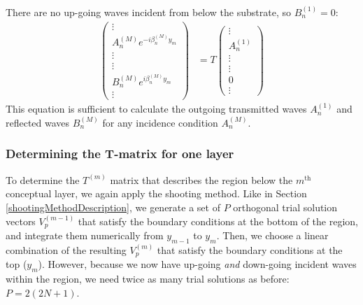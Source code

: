 There are no up-going waves incident from below the substrate, so $B^{(1)}_n = 0$:
\begin{align}
\left(\begin{array}{c}\vdots \\ A^{(M)}_n  e^{-i \beta^{(M)}_n y_m} \\ \vdots \\\hline \vdots \\ B^{(M)}_n e^{i \beta^{(M)}_n y_m} \\ \vdots\end{array}\right)  &= T \left(\begin{array}{c}\vdots \\ A^{(1)}_n \\ \vdots \\\hline \vdots \\ 0 \\ \vdots\end{array}\right)
\label{tMatrixFullStack}
\end{align}
This equation is sufficient to calculate the outgoing transmitted waves $A^{(1)}_n$ and reflected waves $B^{(M)}_n$ for any incidence condition $A_n^{(M)}$.

\subsubsection{Determining the T-matrix for one layer}
To determine the $T^{(m)}$ matrix that describes the region below the $m^\textrm{th}$ conceptual layer, we again apply the shooting method.  Like in Section \ref{shootingMethodDescription}, we generate a set of $P$ orthogonal trial solution vectors $V^{(m-1)}_p$ that satisfy the boundary conditions at the bottom of the region, and integrate them numerically from $y_{m-1}$ to $y_{m}$.  Then, we choose a linear combination of the resulting $V^{(m)}_p$ that satisfy the boundary conditions at the top ($y_m$).  However, because we now have up-going \emph{and} down-going incident waves within the region, we need twice as many trial solutions as before: $P=2(2N+1)$.

